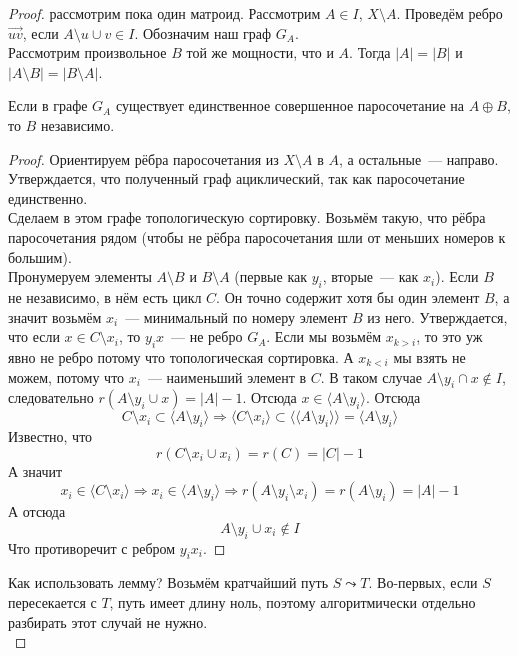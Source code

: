 \documentclass{article}
\begin{document}
    \begin{proof}
        рассмотрим пока один матроид. Рассмотрим $A\in I$, $X\setminus A$. Проведём ребро $\vec{uv}$, если $A\setminus u\cup v\in I$. Обозначим наш граф $G_A$.\\
        Рассмотрим произвольное $B$ той же мощности, что и $A$. Тогда $|A|=|B|$ и $|A\setminus B|=|B\setminus A|$.
        \begin{lemma}
            Если в графе $G_A$ существует единственное совершенное паросочетание на $A\oplus B$, то $B$ независимо.
        \end{lemma}
        \begin{proof}
            Ориентируем рёбра паросочетания из $X\setminus A$ в $A$, а остальные~--- направо.\\
            Утверждается, что полученный граф ациклический, так как паросочетание единственно.\\
            Сделаем в этом графе топологическую сортировку. Возьмём такую, что рёбра паросочетания рядом (чтобы не рёбра паросочетания шли от меньших номеров к большим).\\
            Пронумеруем элементы $A\setminus B$ и $B\setminus A$ (первые как $y_i$, вторые~--- как $x_i$). Если $B$ не независимо, в нём есть цикл $C$. Он точно содержит хотя бы один элемент $B$, а значит возьмём $x_i$~--- минимальный по номеру элемент $B$ из него. Утверждается, что если $x\in C\setminus x_i$, то $y_ix$~--- не ребро $G_A$. Если мы возьмём $x_{k>i}$, то это уж явно не ребро потому что топологическая сортировка. А $x_{k<i}$ мы взять не можем, потому что $x_i$~--- наименьший элемент в $C$. В таком случае $A\setminus y_i\cap x\notin I$, следовательно $r(A\setminus y_i\cup x)=|A|-1$. Отсюда $x\in \langle A\setminus y_i\rangle$. Отсюда
            $$
            C\setminus x_i\subset \langle A\setminus y_i\rangle\Rightarrow \langle C\setminus x_i\rangle\subset \langle\langle A\setminus y_i\rangle\rangle=\langle A\setminus y_i\rangle
            $$
            Известно, что
            $$
            r(C\setminus x_i\cup x_i)=r(C)=|C|-1
            $$
            А значит
            $$
            x_i\in\langle C\setminus x_i\rangle\Rightarrow x_i\in\langle A\setminus y_i\rangle\Rightarrow r(A\setminus y_i\setminus x_i)=r(A\setminus y_i)=|A|-1
            $$
            А отсюда
            $$
            A\setminus y_i\cup x_i\notin I
            $$
            Что противоречит с ребром $y_ix_i$.
        \end{proof}\noindent
        Как использовать лемму? Возьмём кратчайший путь $S\leadsto T$. Во-первых, если $S$ пересекается с $T$, путь имеет длину ноль, поэтому алгоритмически отдельно разбирать этот случай не нужно.\\

\end{proof}
\end{document}
